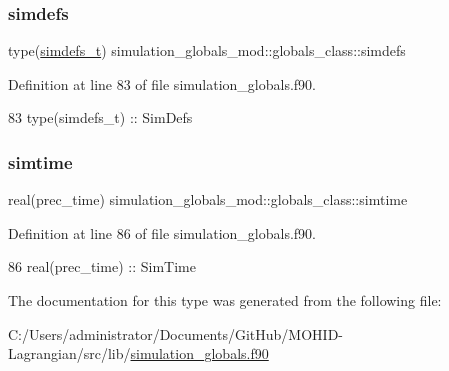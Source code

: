 \subsubsection{\texorpdfstring{simdefs}{simdefs}}
{\footnotesize\ttfamily type(\mbox{\hyperlink{structsimulation__globals__mod_1_1simdefs__t}{simdefs\+\_\+t}}) simulation\+\_\+globals\+\_\+mod\+::globals\+\_\+class\+::simdefs\hspace{0.3cm}{\ttfamily [private]}}



Definition at line 83 of file simulation\+\_\+globals.\+f90.


\begin{DoxyCode}
83         \textcolor{keywordtype}{type}(simdefs\_t)     :: SimDefs
\end{DoxyCode}
\mbox{\label{structsimulation__globals__mod_1_1globals__class_ab28ea8e0cca87c11a33e4acfb3d3b293}} 
\subsubsection{\texorpdfstring{simtime}{simtime}}
{\footnotesize\ttfamily real(prec\+\_\+time) simulation\+\_\+globals\+\_\+mod\+::globals\+\_\+class\+::simtime\hspace{0.3cm}{\ttfamily [private]}}



Definition at line 86 of file simulation\+\_\+globals.\+f90.


\begin{DoxyCode}
86         \textcolor{keywordtype}{real(prec\_time)}     :: SimTime
\end{DoxyCode}


The documentation for this type was generated from the following file\+:\begin{DoxyCompactItemize}
\item 
C\+:/\+Users/administrator/\+Documents/\+Git\+Hub/\+M\+O\+H\+I\+D-\/\+Lagrangian/src/lib/\mbox{\hyperlink{simulation__globals_8f90}{simulation\+\_\+globals.\+f90}}\end{DoxyCompactItemize}

